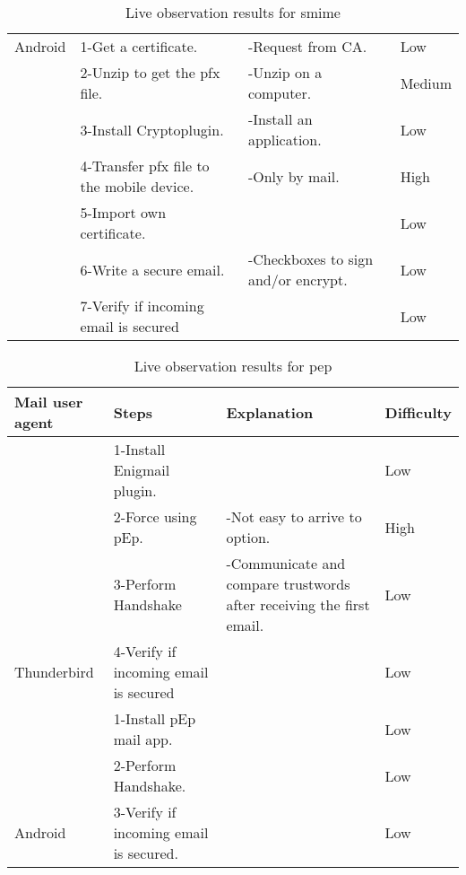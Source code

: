 \begin{appendices}
{\begin{table*}[]
\begin{tabular}{|l|l|l|l|}
			{Android}										&1-Get a certificate.			&-Request from CA.							&Low	\\ \cline{2-4}
			&2-Unzip to get the pfx file.		&-Unzip on a computer.					&Medium		\\	\cline{2-4}
			&3-Install Cryptoplugin.		&-Install an application.				&Low	\\ \cline{2-4}
			&4-Transfer pfx file to the mobile device.		&-Only by mail.				&{\color[HTML]{FE0000} High}	\\ \cline{2-4}
			&5-Import own certificate.			&									&Low	\\ \cline{2-4}
			&6-Write a secure email.		&-Checkboxes to sign and/or encrypt.	&Low	\\ \cline{2-4}
			&7-Verify if incoming email is secured   &								&Low \\ \hline
		\end{tabular}
		\caption{Live observation results for \acrshort{smime} \label{tab:ResultsSMIME}}
	\end{table*}
}

{\def\arraystretch{1.2}\tabcolsep=3pt
	\begin{table*}[!h]
		\scriptsize
		\centering
		\begin{tabularx}{\textwidth}{|l|l|X|l|}
			\hline
			\textbf{Mail user agent}		& \textbf{Steps}   & \textbf{Explanation}  & \textbf{Difficulty}							\\ \hline
			& 1-Install Enigmail plugin.	&      						 											& Low	\\ \cline{2-4}
			& 2-Force using pEp.			& -Not easy to arrive to option.& {\color[HTML]{FE0000} High} \\ \cline{2-4}
			& 3-Perform Handshake			& -Communicate and compare trustwords after receiving the first email.	& Low	\\ \cline{2-4}
			{Thunderbird}					& 4-Verify if incoming email is secured  &                 				& Low	\\ \hline
			& 1-Install pEp mail app.		&                                                                   	& Low	\\ \cline{2-4}
			& 2-Perform Handshake.			&																		& Low	\\ \cline{2-4}
			{Android}     					& 3-Verify if incoming email is secured. &								& Low	\\
			\hline               
		\end{tabularx}
		\caption{Live observation results for \acrshort{pep} \label{tab:ResultspEp}}
	\end{table*}	
}

\end{appendices}